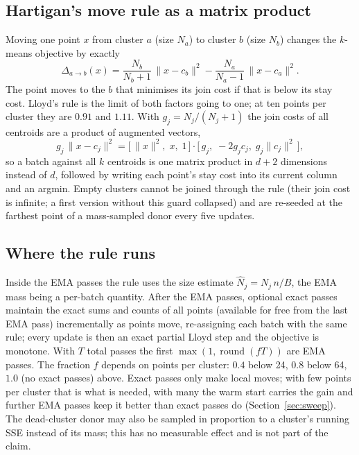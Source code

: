 \documentclass[11pt]{article}
\newcommand{\norm}[1]{\lVert #1 \rVert}
\begin{document}
\subsection{Hartigan's move rule as a matrix product}

Moving one point $x$ from cluster $a$ (size $N_a$) to cluster $b$ (size $N_b$) changes the $k$-means objective by exactly \cite{hartigan}
\begin{equation}
\Delta_{a\to b}(x) = \frac{N_b}{N_b+1}\,\norm{x - c_b}^2 - \frac{N_a}{N_a-1}\,\norm{x - c_a}^2 .
\end{equation}
The point moves to the $b$ that minimises its join cost if that is below its stay cost. Lloyd's rule is the limit of both factors going to one; at ten points per cluster they are $0.91$ and $1.11$. With $g_j = N_j/(N_j+1)$ the join costs of all centroids are a product of augmented vectors,
\begin{equation}
g_j\,\norm{x - c_j}^2 = \big[\,\norm{x}^2,\; x,\; 1\,\big]\cdot\big[\,g_j,\; -2 g_j c_j,\; g_j \norm{c_j}^2\,\big],
\end{equation}
so a batch against all $k$ centroids is one matrix product in $d+2$ dimensions instead of $d$, followed by writing each point's stay cost into its current column and an argmin. Empty clusters cannot be joined through the rule (their join cost is infinite; a first version without this guard collapsed) and are re-seeded at the farthest point of a mass-sampled donor every five updates.

\subsection{Where the rule runs}

Inside the EMA passes the rule uses the size estimate $\hat N_j = N_j\, n/B$, the EMA mass being a per-batch quantity. After the EMA passes, optional exact passes maintain the exact sums and counts of all points (available for free from the last EMA pass) incrementally as points move, re-assigning each batch with the same rule; every update is then an exact partial Lloyd step and the objective is monotone. With $T$ total passes the first $\max(1,\operatorname{round}(f T))$ are EMA passes. The fraction $f$ depends on points per cluster: $0.4$ below 24, $0.8$ below 64, $1.0$ (no exact passes) above. Exact passes only make local moves; with few points per cluster that is what is needed, with many the warm start carries the gain and further EMA passes keep it better than exact passes do (Section~\ref{sec:sweep}). The dead-cluster donor may also be sampled in proportion to a cluster's running SSE instead of its mass; this has no measurable effect and is not part of the claim.
\end{document}
